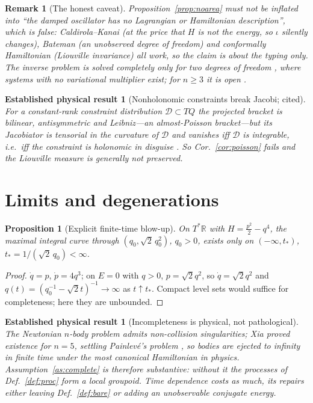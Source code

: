 \documentclass[12pt,a4paper]{article}
\theoremstyle{definition}
\theoremstyle{plain}
\newtheorem{proposition}[definition]{Proposition}
\theoremstyle{commentary}
\newtheorem{established}[definition]{Established physical result}
\newtheorem{remark}[definition]{Remark}
\newcommand{\R}{\mathbb{R}}
\begin{document}
\begin{remark}[The honest caveat]\label{rmk:dampedhonest}
Proposition~\ref{prop:noarea} must not be inflated into ``the damped oscillator has no Lagrangian or
Hamiltonian description'', which is false: Caldirola--Kanai (at the price that $H$ is not the
energy, so $\iota$ silently changes), Bateman \cite{Bateman1931} (an unobserved degree of freedom)
and conformally Hamiltonian (Liouville invariance) all work, so the claim is about the \emph{typing}
only. The inverse problem is solved completely only for two degrees of freedom \cite{Douglas1941},
where systems with \emph{no} variational multiplier exist; for $n\ge3$ it is open
\cite{Santilli1978}.
\end{remark}

\begin{established}[Nonholonomic constraints break Jacobi; cited]\label{est:nonholo}
For a constant-rank constraint distribution $\mathcal{D}\subset TQ$ the projected bracket is
bilinear, antisymmetric and Leibniz---an \emph{almost}-Poisson bracket---but its Jacobiator is
tensorial in the curvature of $\mathcal{D}$ and vanishes \emph{iff} $\mathcal{D}$ is integrable, i.e.\
iff the constraint is holonomic in disguise \cite{Bloch2015}. So Cor.~\ref{cor:poisson} fails and the
Liouville measure is generally not preserved.
\end{established}

\section{Limits and degenerations}
\label{sec:limits}

\begin{proposition}[Explicit finite-time blow-up]\label{prop:blowup}
On $T^*\R$ with $H=\tfrac{p^2}{2}-q^4$, the maximal integral curve through $(q_0,\sqrt2\,q_0^2)$,
$q_0>0$, exists only on $(-\infty,t_*)$, $t_*=1/(\sqrt2\,q_0)<\infty$.
\end{proposition}
\begin{proof}
$\dot q=p$, $\dot p=4q^3$; on $E=0$ with $q>0$, $p=\sqrt2q^2$, so $\dot q=\sqrt2q^2$ and
$q(t)=(q_0^{-1}-\sqrt2t)^{-1}\to\infty$ as $t\uparrow t_*$. Compact level sets would suffice for
completeness; here they are unbounded.
\end{proof}

\begin{established}[Incompleteness is physical, not pathological]\label{est:xia}
The Newtonian $n$-body problem admits non-collision singularities; Xia proved existence for $n=5$,
settling Painlev\'e's problem \cite{Xia1992}, so bodies are ejected to infinity in finite time under
the most canonical Hamiltonian in physics. Assumption~\ref{as:complete} is therefore substantive:
without it the processes of Def.~\ref{def:proc} form a local groupoid. Time dependence costs as much,
its repairs either leaving Def.~\ref{def:bare} or adding an unobservable conjugate energy.
\end{established}
\end{document}
